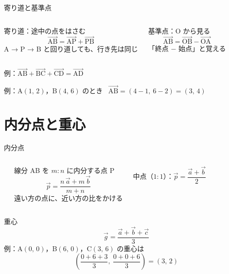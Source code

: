 \documentclass[aspectratio=169]{beamer}
\begin{document}
\begin{frame}{寄り道と基準点}
  \begin{columns}[t]
      \begin{block}{寄り道：途中の点をはさむ}
        \[
          \overrightarrow{\mathrm{AB}} = \overrightarrow{\mathrm{AP}} + \overrightarrow{\mathrm{PB}}
        \]
        {\small A → P → B と回り道しても、行き先は同じ}
      \end{block}
      \begin{block}{基準点：O から見る}
        \[
          \overrightarrow{\mathrm{AB}} = \overrightarrow{\mathrm{OB}} - \overrightarrow{\mathrm{OA}}
        \]
        {\small 「終点 − 始点」と覚える}
      \end{block}
  \end{columns}
  \medskip
  例：$\overrightarrow{\mathrm{AB}} + \overrightarrow{\mathrm{BC}} + \overrightarrow{\mathrm{CD}} = \overrightarrow{\mathrm{AD}}$
  \medskip

  例：A$(1,\,2)$，B$(4,\,6)$ のとき \ $\overrightarrow{\mathrm{AB}} = (4-1,\ 6-2) = (3,\, 4)$
\end{frame}

\section{内分点と重心}

\begin{frame}{内分点}
  \begin{columns}[c]
      \begin{center}
        
      \end{center}
      線分 AB を $m:n$ に内分する点 P
      \[
        \vec{p} = \frac{n\,\vec{a} + m\,\vec{b}}{m + n}
      \]
      {\small 遠い方の点に、近い方の比をかける}
      \medskip

      中点（$1:1$）：$\vec{p} = \dfrac{\vec{a} + \vec{b}}{2}$
  \end{columns}
\end{frame}

\begin{frame}{重心}
  \[
    \vec{g} = \frac{\vec{a} + \vec{b} + \vec{c}}{3}
  \]
  例：A$(0,\,0)$，B$(6,\,0)$，C$(3,\,6)$ の重心は
  \[
    \left(\frac{0 + 6 + 3}{3},\ \frac{0 + 0 + 6}{3}\right) = (3,\, 2)
  \]
\end{frame}
\end{document}
